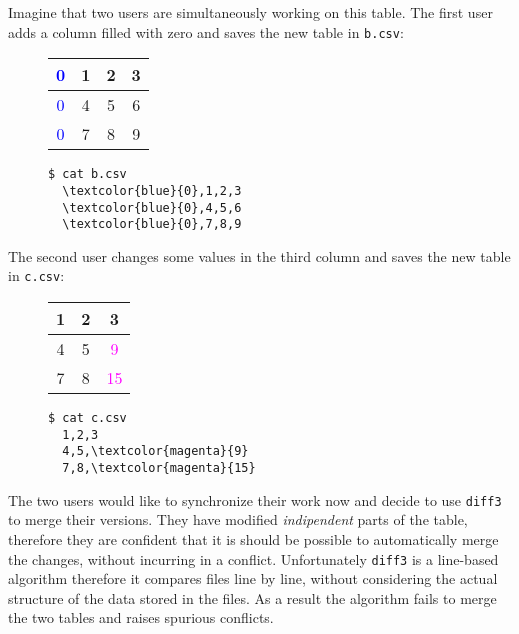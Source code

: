 \documentclass[preprint]{sigplanconf}
\begin{document}
\newpage
Imagine that two users are simultaneously working on this table.
The first user adds a column filled with zero and saves the new table in \texttt{b.csv}:
\begin{figure}[h]
\centering
\begin{minipage}{.25\textwidth}
  \centering
  \begin{tabular}{ | c | c | c | c | }
    \hline
    \textcolor{blue}{0} & 1 & 2 & 3 \\ \hline
    \textcolor{blue}{0} & 4 & 5 & 6 \\ \hline
    \textcolor{blue}{0} & 7 & 8 & 9  \\ \hline
  \end{tabular}
\end{minipage}%
\begin{minipage}{.25\textwidth}
  \centering
\begin{Verbatim}[commandchars=\\\{\}]
  $ cat b.csv
  \textcolor{blue}{0},1,2,3
  \textcolor{blue}{0},4,5,6
  \textcolor{blue}{0},7,8,9
\end{Verbatim}
\end{minipage}%
\end{figure} 

The second user changes some values in the third column and saves the new table in  \texttt{c.csv}:
\begin{figure}[h]
\centering
\begin{minipage}{.25\textwidth}
  \centering
  \begin{tabular}{ | c | c | c | }
    \hline
    1 & 2 & 3 \\ \hline
    4 & 5 & \textcolor{magenta}{9} \\ \hline
    7 & 8 & \textcolor{magenta}{15} \\ \hline
  \end{tabular}
\end{minipage}%
\begin{minipage}{.25\textwidth}
  \centering
  \begin{Verbatim}[commandchars=\\\{\}]
  $ cat c.csv
  1,2,3
  4,5,\textcolor{magenta}{9}
  7,8,\textcolor{magenta}{15}
  \end{Verbatim}
\end{minipage}%
\end{figure}

The two users would like to synchronize their work now and decide to use 
\texttt{diff3} to merge their versions. They have modified \emph{indipendent} parts of the table, therefore they are confident that it is should be possible to automatically merge the changes, without incurring in a conflict.
Unfortunately \texttt{diff3} is a line-based algorithm therefore it compares files line by line, without considering the actual structure of the data stored in the files. As a result the algorithm fails to merge the two tables and raises spurious conflicts.
\end{document}
